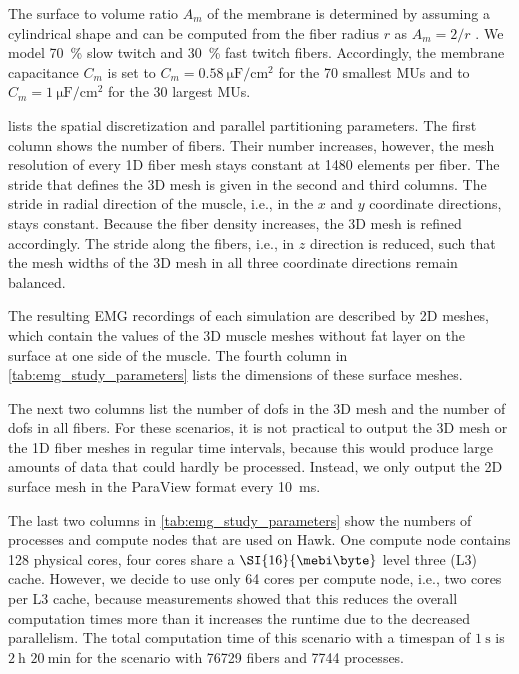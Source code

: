 The surface to volume ratio $A_m$ of the membrane is determined by assuming a cylindrical shape and can be computed from the fiber radius $r$ as $A_m = 2/r$ \cite{Klotz2020}. We model \SI{70}{\percent} slow twitch and \SI{30}{\percent} fast twitch fibers. Accordingly, the membrane capacitance $C_m$ is set to $C_m = \SI{0.58}{\micro\farad\per\centi\meter\squared}$ for the 70 smallest MUs and to $C_m = \SI{1}{\micro\farad\per\centi\meter\squared}$ for the 30 largest MUs.

 lists the spatial discretization and parallel partitioning parameters. The first column shows the number of fibers. Their number increases, however, the mesh resolution of every 1D fiber mesh stays constant at 1480 elements per fiber. The stride that defines the 3D mesh is given in the second and third columns. The stride in radial direction of the muscle, i.e., in the $x$ and $y$ coordinate directions, stays constant. Because the fiber density increases, the 3D mesh is refined accordingly. The stride along the fibers, i.e., in $z$ direction is reduced, such that the mesh widths of the 3D mesh in all three coordinate directions remain balanced.

The resulting EMG recordings of each simulation are described by 2D meshes, which contain the values of the 3D muscle meshes without fat layer on the surface at one side of the muscle.  The fourth column in \cref{tab:emg_study_parameters} lists the dimensions of these surface meshes. 

The next two columns list the number of dofs in the 3D mesh and the number of dofs in all fibers. For these scenarios, it is not practical to output the 3D mesh or the 1D fiber meshes in regular time intervals, because this would produce large amounts of data that could hardly be processed. Instead, we only output the 2D surface mesh in the ParaView format every \SI{10}{\milli\second}.

The last two columns in \cref{tab:emg_study_parameters} show the numbers of processes and compute nodes that are used on Hawk. One compute node contains 128 physical cores, four cores share a $\SI{16}{\mebi\byte}$ level three (L3) cache. However, we decide to use only 64 cores per compute node, i.e., two cores per L3 cache, because measurements showed that this reduces the overall computation times more than it increases the runtime due to the decreased parallelism. The total computation time of this scenario with a timespan of $\SI{1}{\s}$ is $\SI{2}{\hour}$ $\SI{20}{\minute}$ for the scenario with \num{76729} fibers and 7744 processes.

